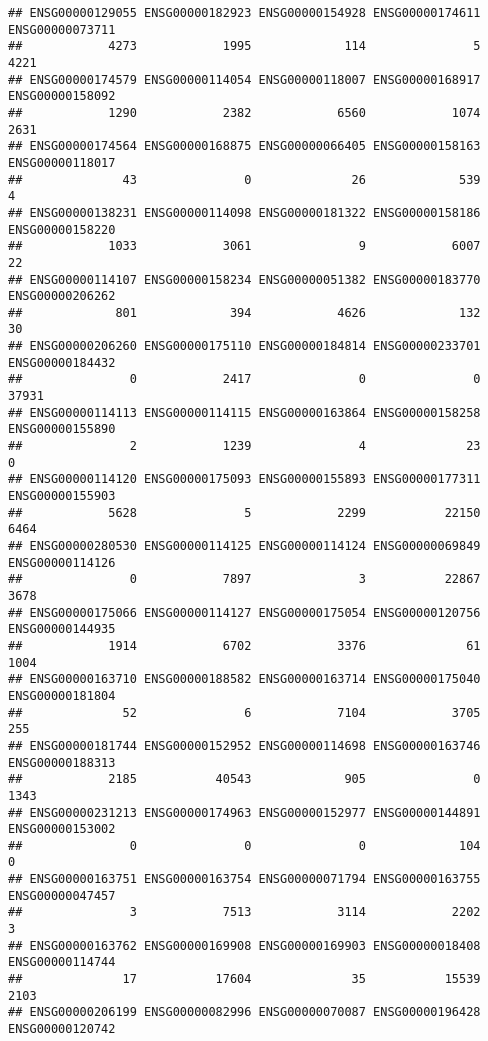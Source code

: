 \documentclass[
]{article}
\begin{document}
\begin{verbatim}
## ENSG00000129055 ENSG00000182923 ENSG00000154928 ENSG00000174611 ENSG00000073711 
##            4273            1995             114               5            4221 
## ENSG00000174579 ENSG00000114054 ENSG00000118007 ENSG00000168917 ENSG00000158092 
##            1290            2382            6560            1074            2631 
## ENSG00000174564 ENSG00000168875 ENSG00000066405 ENSG00000158163 ENSG00000118017 
##              43               0              26             539               4 
## ENSG00000138231 ENSG00000114098 ENSG00000181322 ENSG00000158186 ENSG00000158220 
##            1033            3061               9            6007              22 
## ENSG00000114107 ENSG00000158234 ENSG00000051382 ENSG00000183770 ENSG00000206262 
##             801             394            4626             132              30 
## ENSG00000206260 ENSG00000175110 ENSG00000184814 ENSG00000233701 ENSG00000184432 
##               0            2417               0               0           37931 
## ENSG00000114113 ENSG00000114115 ENSG00000163864 ENSG00000158258 ENSG00000155890 
##               2            1239               4              23               0 
## ENSG00000114120 ENSG00000175093 ENSG00000155893 ENSG00000177311 ENSG00000155903 
##            5628               5            2299           22150            6464 
## ENSG00000280530 ENSG00000114125 ENSG00000114124 ENSG00000069849 ENSG00000114126 
##               0            7897               3           22867            3678 
## ENSG00000175066 ENSG00000114127 ENSG00000175054 ENSG00000120756 ENSG00000144935 
##            1914            6702            3376              61            1004 
## ENSG00000163710 ENSG00000188582 ENSG00000163714 ENSG00000175040 ENSG00000181804 
##              52               6            7104            3705             255 
## ENSG00000181744 ENSG00000152952 ENSG00000114698 ENSG00000163746 ENSG00000188313 
##            2185           40543             905               0            1343 
## ENSG00000231213 ENSG00000174963 ENSG00000152977 ENSG00000144891 ENSG00000153002 
##               0               0               0             104               0 
## ENSG00000163751 ENSG00000163754 ENSG00000071794 ENSG00000163755 ENSG00000047457 
##               3            7513            3114            2202               3 
## ENSG00000163762 ENSG00000169908 ENSG00000169903 ENSG00000018408 ENSG00000114744 
##              17           17604              35           15539            2103 
## ENSG00000206199 ENSG00000082996 ENSG00000070087 ENSG00000196428 ENSG00000120742 

\end{verbatim}
\end{document}
